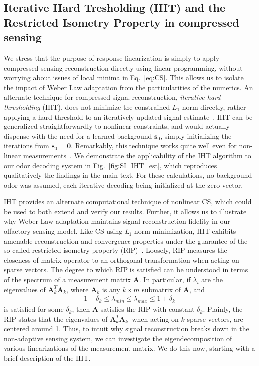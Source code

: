 \documentclass[9pt,twoside,lineno]{pnas-new}
\begin{document}
\subsection*{Iterative Hard Tresholding (IHT) and the Restricted Isometry Property in compressed sensing}
We stress that the purpose of response linearization is simply to apply compressed sensing reconstruction directly using linear programming, without worrying about issues of local minima in Eq.~\ref{eq:CS}. This allows us to isolate the impact  of Weber Law adaptation from the particularities of the numerics. An alternate technique for compressed signal reconstruction, \textit{iterative hard thresholding} (IHT), does not minimize the constrained $L_1$ norm directly, rather applying a hard threshold to an iteratively updated signal estimate~\cite{IHT}. IHT can be generalized straightforwardly to nonlinear constraints, and would actually dispense with the need for a learned background $\mathbf {s}_0$, simply initializing the iterations from $\mathbf {s}_0 = \mathbf 0$. Remarkably, this technique works quite well even for non-linear measurements~\cite{nonlin_CS}. We demonstrate the applicability of the IHT algorithm to our odor decoding system in Fig.~\ref{fig:SI_IHT_est}, which reproduces qualitatively the findings in the main text. For these calculations, no background odor was assumed, each iterative decoding being initialized at the zero vector. 

IHT provides an alternate computational technique of nonlinear CS, which could be used to both extend and verify our results. Further, it allows us to illustrate why Weber Law adaptation maintains signal reconstruction fidelity in our olfactory sensing model. Like CS using $L_1$-norm minimization, IHT exhibits amenable reconstruction and convergence properties under the guarantee of the so-called restricted isometry property (RIP)~\cite{CS_tao_2}. Loosely, RIP measures the closeness of matrix operator to an orthogonal transformation when acting on sparse vectors. The degree to which RIP is satisfied can be understood in terms of the spectrum of a measurement matrix $\mathbf A$. In particular, if $\lambda_i$ are the eigenvalues of $\mathbf {A}_k^T\mathbf {A}_k$, where $\mathbf A_k$ is any $k \times m$ submatrix of $\mathbf A$, and 
\begin{align*}
    1 - \delta_k \leq \lambda_{min} \leq \lambda_{max} \leq 1 + \delta_k
\end{align*}
is satisfied for some $\delta_k$, then $\mathbf A$ satisfies the RIP with constant $\delta_k$. Plainly, the RIP states that the eigenvalues of $\mathbf {A}_k^T\mathbf {A}_k$, when acting on $k$-sparse vectors, are centered around 1. Thus, to intuit why signal reconstruction breaks down in the non-adaptive sensing system, we can investigate the eigendecomposition of various linearizations of the measurement matrix. We do this now, starting with a brief description of the IHT.
\end{document}

